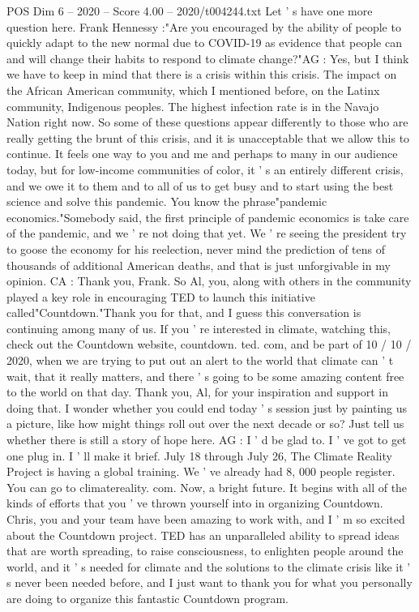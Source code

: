 \begin{textsample}{POS Dim 6 – 2020 – Score 4.00 – 2020/t004244.txt}
Let ' s have one more question here.
Frank Hennessy :"Are you encouraged by the ability of people to quickly adapt to the new normal due to COVID-19 as evidence that people can and will change their habits to respond to climate change?"AG : Yes, but I think we have to keep in mind that there is a crisis within this crisis.
The impact on the African American community, which I mentioned before, on the Latinx community, Indigenous peoples.
The highest infection rate is in the Navajo Nation right now.
So some of these questions appear differently to those who are really getting the brunt of this crisis, and it is unacceptable that we allow this to continue.
It feels one way to you and me and perhaps to many in our audience today, but for low-income communities of color, it ' s an entirely different crisis, and we owe it to them and to all of us to get busy and to start using the best science and solve this pandemic.
You know the phrase"pandemic economics."Somebody said, the first principle of pandemic economics is take care of the pandemic, and we ' re not doing that yet.
We ' re seeing the president try to goose the economy for his reelection, never mind the prediction of tens of thousands of additional American deaths, and that is just unforgivable in my opinion.
CA : Thank you, Frank.
So Al, you, along with others in the community played a key role in encouraging TED to launch this initiative called"Countdown."Thank you for that, and I guess this conversation is continuing among many of us.
If you ' re interested in climate, watching this, check out the Countdown website, countdown. ted. com, and be part of 10 / 10 / 2020, when we are trying to put out an alert to the world that climate can ' t wait, that it really matters, and there ' s going to be some amazing content free to the world on that day.
Thank you, Al, for your inspiration and support in doing that.
I wonder whether you could end today ' s session just by painting us a picture, like how might things roll out over the next decade or so?
Just tell us whether there is still a story of hope here.
AG : I ' d be glad to.
I ' ve got to get one plug in.
I ' ll make it brief.
July 18 through July 26, The Climate Reality Project is having a global training.
We ' ve already had 8, 000 people register.
You can go to climatereality. com.
Now, a bright future.
It begins with all of the kinds of efforts that you ' ve thrown yourself into in organizing Countdown.
Chris, you and your team have been amazing to work with, and I ' m so excited about the Countdown project.
TED has an unparalleled ability to spread ideas that are worth spreading, to raise consciousness, to enlighten people around the world, and it ' s needed for climate and the solutions to the climate crisis like it ' s never been needed before, and I just want to thank you for what you personally are doing to organize this fantastic Countdown program.

\end{textsample}
